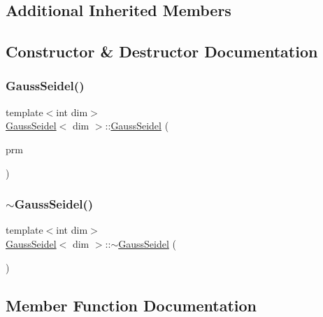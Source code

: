 \subsection*{Additional Inherited Members}


\subsection{Constructor \& Destructor Documentation}
\mbox{\label{class_gauss_seidel_a6024b3a7447aa8fb1cd0bd513c1af81e}} 
\subsubsection{\texorpdfstring{Gauss\+Seidel()}{GaussSeidel()}}
{\footnotesize\ttfamily template$<$int dim$>$ \\
\hyperlink{class_gauss_seidel}{Gauss\+Seidel}$<$ dim $>$\+::\hyperlink{class_gauss_seidel}{Gauss\+Seidel} (\begin{DoxyParamCaption}\item[{const Parameter\+Handler \&}]{prm }\end{DoxyParamCaption})}

\mbox{\label{class_gauss_seidel_a4d41231183512ec5aab1fa7088c60788}} 
\subsubsection{\texorpdfstring{$\sim$\+Gauss\+Seidel()}{~GaussSeidel()}}
{\footnotesize\ttfamily template$<$int dim$>$ \\
\hyperlink{class_gauss_seidel}{Gauss\+Seidel}$<$ dim $>$\+::$\sim$\hyperlink{class_gauss_seidel}{Gauss\+Seidel} (\begin{DoxyParamCaption}{ }\end{DoxyParamCaption})}



\subsection{Member Function Documentation}
\mbox{\label{class_gauss_seidel_a24619a31b8a3d787bdc98e33a13f0ba6}} 
